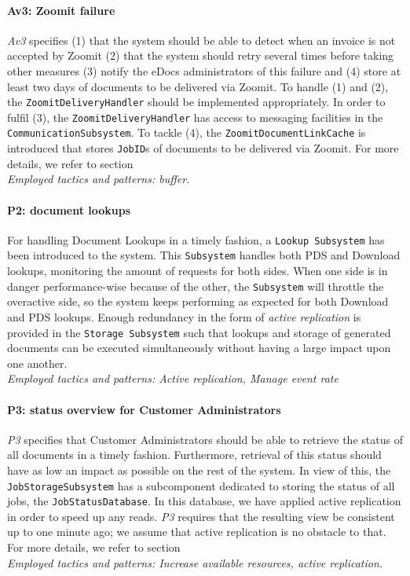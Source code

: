 \paragraph{Av3\@: Zoomit failure} \emph{Av3} specifies (1) that the system should be able to detect when an invoice is not accepted by Zoomit (2) that the system should retry several times before taking other measures (3) notify the eDocs administrators of this failure and (4) store at least two days of documents to be delivered via Zoomit. To handle (1) and (2), the \texttt{ZoomitDeliveryHandler} should be implemented appropriately. In order to fulfil (3), the \texttt{ZoomitDeliveryHandler} has access to messaging facilities in the \texttt{CommunicationSubsystem}. To tackle (4), the \texttt{ZoomitDocumentLinkCache} is introduced that stores \texttt{JobID}s of documents to be delivered via Zoomit. For more details, we refer to section \\
\emph{Employed tactics and patterns: buffer.}
    
\paragraph{P2\@: document lookups}
For handling Document Lookups in a timely fashion, a \texttt{Lookup Subsystem} has been introduced to the system. This \texttt{Subsystem} handles both PDS and Download lookups, monitoring the amount of requests for both sides. When one side is in danger performance-wise because of the other, the \texttt{Subsystem} will throttle the overactive side, so the system keeps performing as expected for both Download and PDS lookups. Enough redundancy in the form of \emph{active replication} is provided in the \texttt{Storage Subsystem} such that lookups and storage of generated documents can be executed simultaneously without having a large impact upon one another.\\
\emph{Employed tactics and patterns: Active replication, Manage event rate}
    
\paragraph{P3\@: status overview for Customer Administrators} \emph{P3} specifies that Customer Administrators should be able to retrieve the status of all documents in a timely fashion. Furthermore, retrieval of this status should have as low an impact as possible on the rest of the system. In view of this, the \texttt{JobStorageSubsystem} has a subcomponent dedicated to storing the status of all jobs, the \texttt{JobStatusDatabase}. In this database, we have applied active replication in order to speed up any reads. \emph{P3} requires that the resulting view be consistent up to one minute ago; we assume that active replication is no obstacle to that. For more details, we refer to section \\
\emph{Employed tactics and patterns: Increase available resources, active replication.}
    

